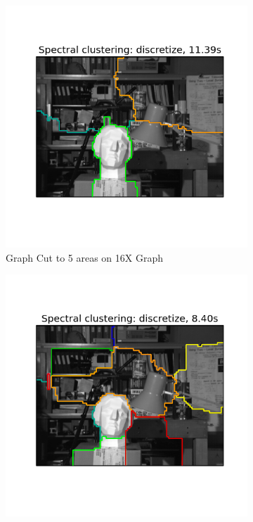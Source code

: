 \begin{figure}[h!]
        \begin{subfigure}[h]{0.33\textwidth}
                \includegraphics[width=\textwidth]{fig/592_small4_5.png}
                \caption{Graph Cut to 5 areas on 16X Graph}
                \label{fig:graphcut_small4_5}
        \end{subfigure}%
        \begin{subfigure}[h]{0.33\textwidth}
                \includegraphics[width=\textwidth]{fig/592_small4_10.png}

\end{subfigure}
\end{figure}
